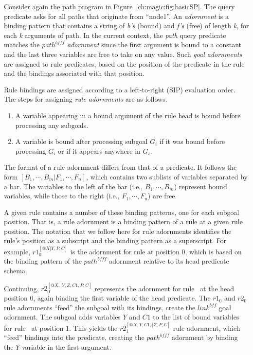 Consider again the path program in Figure~\ref{ch:magic:fig:basicSP}.  The
query predicate  asks for all paths that originate
from ``node1''.  An {\em adornment} is a binding pattern that contains a string
of {\em b's} (bound) and {\em f's} (free) of length {\em k}, for each {\em k}
arguments of path.  In the current context, the {\em path} query predicate
matches the $path^{bfff}$ {\em adornment} since the first argument is bound to
a constant and the last three variables are free to take on any value.  Such
{\em goal adornments} are assigned to rule predicates, based on the position of
the predicate in the rule and the bindings associated with that position.

Rule bindings are assigned according to a left-to-right (SIP) evaluation order.
The steps for assigning {\em rule adornments} are as follows.
\begin{enumerate}
    \ssp
    \item A variable appearing in a bound argument of the rule head is bound before processing any subgoals.
    \item A variable is bound after processing subgoal $G_i$ if it was bound 
          before processing $G_i$ or if it appears anywhere in $G_i$.
\end{enumerate}
The format of a rule adornment differs from that of a predicate.  It follows the form
$[B_1,\cdots,B_m|F_1,\cdots,F_n]$, which contains two sublists of variables
separated by a bar.  The variables to the left of the bar (i.e.,
$B_1,\cdots,B_m$) represent bound variables, while those to the right (i.e.,
$F_1,\cdots,F_n$) are free. 

A given rule contains a number of these binding patterns, one for each subgoal
position.  That is, a rule adornment is a binding pattern of a rule at a given
rule position.  The notation that we follow here for rule adornments identifies
the rule's position as a subscript and the binding pattern as a superscript.
For example, $r1_0^{[@X|Y,P,C]}$ is the adornment for rule  at position
$0$, which is based on the binding pattern of the $path^{bfff}$ adornment
relative to its head predicate schema.

Continuing, $r2_0^{[@X,|Y,Z,C1,P,C]}$ represents the adornment for rule~
at the head position $0$, again binding the first variable of the head
predicate.  The $r1_0$ and $r2_0$ rule adornments ``feed'' the 
subgoal with its bindings, create the $link^{bff}$ goal adornment.  The
 subgoal adds variables $Y$ and $C1$ to the list of bound variables
for rule~ at position $1$.  This yields the $r2_1^{[@X,Y,C1,|Z,P,C]}$
rule adornment, which ``feed'' bindings into the  predicate, creating
the $path^{bfff}$ adornment by binding the $Y$ variable in the first argument.

